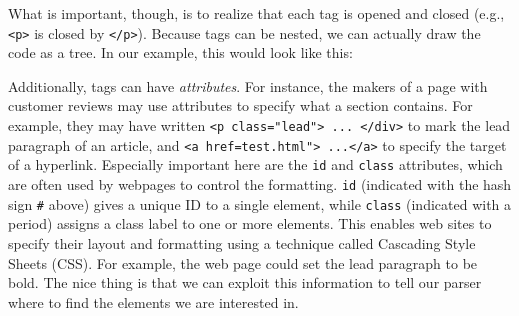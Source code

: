 What is important, though, is to realize that each tag is opened and
closed (e.g., \verb|<p>| is closed by \verb|</p>|).
Because tags can be nested, we can actually
draw the code as a tree. In our example, this would look like this:



Additionally, tags can have \emph{attributes}. For instance, the
makers of a page with customer reviews may use attributes to specify
what a section contains. For example, they may have written
\verb|<p class="lead"> ... </div>| to mark the lead paragraph of an article,
and \verb|<a href=test.html"> ...</a>| to specify the target of a hyperlink.
Especially important here are the \verb|id| and \verb|class| attributes,
which are often used by webpages to control the formatting.
\verb|id| (indicated with the hash sign \verb|#| above) gives a unique ID to a single element,
while \verb|class| (indicated with a period) assigns a class label to one or more elements.
This enables web sites to specify their layout and formatting using a technique called Cascading Style Sheets (CSS).
For example, the web page could set the lead paragraph to be bold.
The nice thing is that we can exploit
this information to tell our parser where to find the elements we
are interested in.

%



